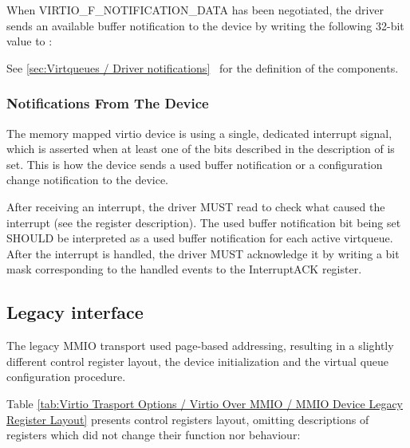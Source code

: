 When VIRTIO_F_NOTIFICATION_DATA has been negotiated,
the driver sends an available buffer notification to the device by writing
the following 32-bit value to :


See \ref{sec:Virtqueues / Driver notifications}~
for the definition of the components.

\subsubsection{Notifications From The Device}\label{sec:Virtio Transport Options / Virtio Over MMIO / MMIO-specific Initialization And Device Operation / Notifications From The Device}

The memory mapped virtio device is using a single, dedicated
interrupt signal, which is asserted when at least one of the
bits described in the description of 
is set. This is how the device sends a used buffer notification
or a configuration change notification to the device.

After receiving an interrupt, the driver MUST read
 to check what caused the interrupt (see the
register description).  The used buffer notification bit being set
SHOULD be interpreted as a used buffer notification for each active
virtqueue.  After the interrupt is handled, the driver MUST acknowledge
it by writing a bit mask corresponding to the handled events to the
InterruptACK register.

\subsection{Legacy interface}\label{sec:Virtio Transport Options / Virtio Over MMIO / Legacy interface}

The legacy MMIO transport used page-based addressing, resulting
in a slightly different control register layout, the device
initialization and the virtual queue configuration procedure.

Table \ref{tab:Virtio Trasport Options / Virtio Over MMIO / MMIO Device Legacy Register Layout} 
presents control registers layout, omitting
descriptions of registers which did not change their function
nor behaviour:

